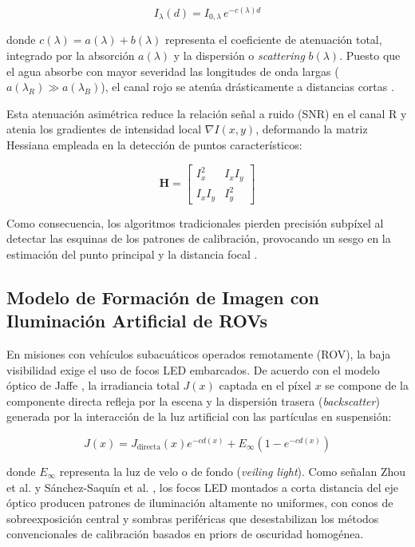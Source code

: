 \documentclass[12pt,letterpaper,spanish,twoside,openright]{report}
\begin{document}
\begin{equation}
I_\lambda(d) = I_{0, \lambda} \, e^{-c(\lambda) d}
\end{equation}

donde $c(\lambda) = a(\lambda) + b(\lambda)$ representa el coeficiente de atenuación total, integrado por la absorción $a(\lambda)$ y la dispersión o \textit{scattering} $b(\lambda)$. Puesto que el agua absorbe con mayor severidad las longitudes de onda largas ($a(\lambda_R) \gg a(\lambda_B)$), el canal rojo se atenúa drásticamente a distancias cortas \parencite{10.1145/3511021}.

Esta atenuación asimétrica reduce la relación señal a ruido (SNR) en el canal R y atenia los gradientes de intensidad local $\nabla I(x,y)$, deformando la matriz Hessiana empleada en la detección de puntos característicos:

\begin{equation}
\mathbf{H} = \begin{bmatrix} I_x^2 & I_x I_y \\ I_x I_y & I_y^2 \end{bmatrix}
\end{equation}

Como consecuencia, los algoritmos tradicionales pierden precisión subpíxel al detectar las esquinas de los patrones de calibración, provocando un sesgo en la estimación del punto principal y la distancia focal \parencite{10772075}.

\subsection{Modelo de Formación de Imagen con Iluminación Artificial de ROVs}

En misiones con vehículos subacuáticos operados remotamente (ROV), la baja visibilidad exige el uso de focos LED embarcados. De acuerdo con el modelo óptico de Jaffe \parencite{Jaffe1990}, la irradiancia total $J(x)$ captada en el píxel $x$ se compone de la componente directa refleja por la escena y la dispersión trasera (\textit{backscatter}) generada por la interacción de la luz artificial con las partículas en suspensión:

\begin{equation}
J(x) = J_{\text{directa}}(x) e^{-c d(x)} + E_{\infty} \left( 1 - e^{-c d(x)} \right)
\end{equation}

donde $E_{\infty}$ representa la luz de velo o de fondo (\textit{veiling light}). Como señalan Zhou et al. \parencite{Zhou2025} y Sánchez-Saquín et al. \parencite{hamilton2024}, los focos LED montados a corta distancia del eje óptico producen patrones de iluminación altamente no uniformes, con conos de sobreexposición central y sombras periféricas que desestabilizan los métodos convencionales de calibración basados en priors de oscuridad homogénea.
\end{document}
